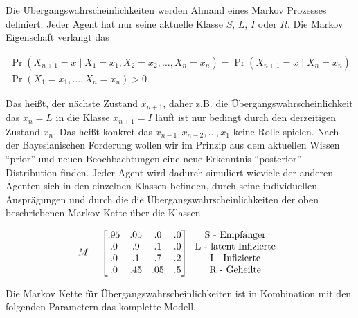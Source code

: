\documentclass[paper=a4, fontsize=11pt, ngerman, abstract=on]{scrartcl}
\numberwithin{equation}{section} %
\numberwithin{figure}{section} %
\numberwithin{table}{section} %
\begin{document}
Die Übergangswahrscheinlichkeiten werden Ahnand eines Markov Prozesses definiert. Jeder Agent hat nur seine aktuelle Klasse $S$, $L$, $I$ oder $R$. Die Markov Eigenschaft verlangt das

\begin{gather*}
\Pr(X_{n+1}=x\mid X_{1}=x_{1},X_{2}=x_{2},\ldots ,X_{n}=x_{n})=\Pr(X_{n+1}=x\mid X_{n}=x_{n}) \\
\Pr(X_{1}=x_{1},\ldots,X_{n}=x_{n})>0
\end{gather*}

Das heißt, der nächste Zustand $x_{n + 1}$, daher z.B. die Übergangswahrscheinlichkeit das $x_{n} = L$ in die Klasse $x_{n + 1} = I$ läuft ist nur bedingt durch den derzeitigen Zustand $x_{n}$. Das heißt konkret das $x_{n-1}, x_{n-2}, \ldots, x_{1}$ keine Rolle spielen. Nach der Bayesianischen Forderung wollen wir im Prinzip aus dem aktuellen Wissen ``prior'' und neuen Beochbachtungen eine neue Erkenntnis ``posterior'' Distribution finden. Jeder Agent wird dadurch simuliert wieviele der anderen Agenten sich in den einzelnen Klassen befinden, durch seine individuellen Ausprägungen und durch die die Übergangswahrscheinlichkeiten der oben beschriebenen Markov Kette über die Klassen.

\[
M=
  \begin{bmatrix}
    .95 & .05 & .0 & .0 \\
    .0 & .9 & .1 & .0 \\
    .0 & .1 & .7 & .2 \\
    .0 & .45 & .05 & .5 \\
  \end{bmatrix}
  \begin{tabular}{c}
    \text{S - Empfänger} \\
    \text{L - latent Infizierte} \\
    \text{I - Infizierte} \\
    \text{R - Geheilte}
  \end{tabular}
\]

Die Markov Kette für Übergangswahrscheinlichkeiten ist in Kombination mit den folgenden Parametern das komplette Modell.
\end{document}
